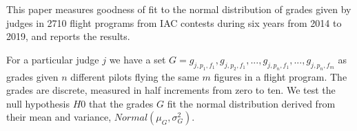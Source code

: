This paper measures goodness of fit to the normal distribution of
grades given by judges in 2710 flight programs from IAC contests
during six years from 2014 to 2019, and reports the results.

For a particular judge $j$ we have a set
$G = g_{j,p_1,f_1}, g_{j,p_2,f_1}, ..., g_{j,p_n,f_1}, ..., g_{j,p_n,f_m}$
as grades given $n$ different pilots flying the same $m$ figures
in a flight program. The grades are discrete, measured in half
increments from zero to ten.  We test the null hypothesis $H0$ that the grades
$G$ fit
the normal distribution derived from their mean and variance,
$Normal(\mu_G, \sigma^2_G)$.
